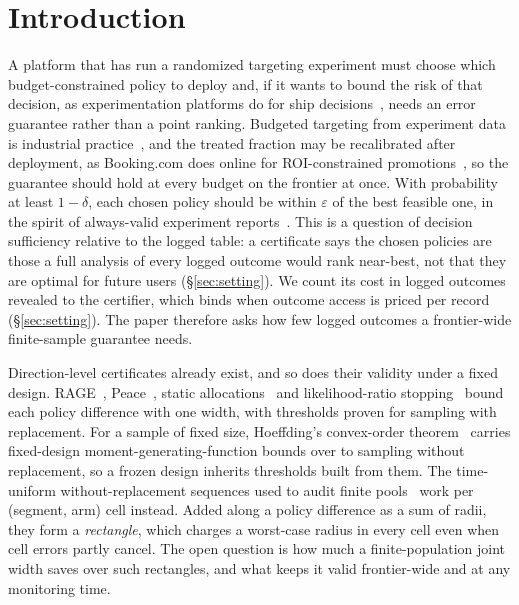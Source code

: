 \documentclass[sigconf,anonymous,review]{acmart}
\newcommand{\eps}{\varepsilon}
\begin{document}

\maketitle

\section{Introduction}\label{sec:intro}

A platform that has run a randomized targeting experiment must choose which budget-constrained policy to deploy and, if it wants to bound the risk of that decision, as experimentation platforms do for ship decisions~\citep{schultzberg2024riskaware}, needs an error guarantee rather than a point ranking. Budgeted targeting from experiment data is industrial practice~\citep{zhao2019uplift,ai2022lbcf}, and the treated fraction may be recalibrated after deployment, as Booking.com does online for ROI-constrained promotions~\citep{goldenberg2020freelunch}, so the guarantee should hold at every budget on the frontier at once. With probability at least $1-\delta$, each chosen policy should be within $\eps$ of the best feasible one, in the spirit of always-valid experiment reports~\citep{johari2017peeking,howard2021time}. This is a question of decision sufficiency relative to the logged table: a certificate says the chosen policies are those a full analysis of every logged outcome would rank near-best, not that they are optimal for future users (\S\ref{sec:setting}). We count its cost in logged outcomes revealed to the certifier, which binds when outcome access is priced per record (\S\ref{sec:setting}). The paper therefore asks how few logged outcomes a frontier-wide finite-sample guarantee needs.

Direction-level certificates already exist, and so does their validity under a fixed design. RAGE~\citep{fiez2019sequential}, Peace~\citep{katzsamuels2020empirical}, static allocations~\citep{soare2014best} and likelihood-ratio stopping~\citep{garivier2016optimal,jourdan2021efficient} bound each policy difference with one width, with thresholds proven for sampling with replacement. For a sample of fixed size, Hoeffding's convex-order theorem~\citep{hoeffding1963probability} carries fixed-design moment-generating-function bounds over to sampling without replacement, so a frozen design inherits thresholds built from them. The time-uniform without-replacement sequences used to audit finite pools~\citep{waudbysmith2020confidence,waudbysmith2024estimating} work per (segment, arm) cell instead. Added along a policy difference as a sum of radii, they form a \emph{rectangle}, which charges a worst-case radius in every cell even when cell errors partly cancel. The open question is how much a finite-population joint width saves over such rectangles, and what keeps it valid frontier-wide and at any monitoring time.
\end{document}
